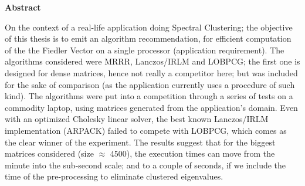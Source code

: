 \thispagestyle{plain}
\begin{center}

  \vspace{0.4cm}


  \vspace{0.9cm}
  \textbf{Abstract}
\end{center}

    On the context of a real-life application doing Spectral
    Clustering; the objective of this thesis is to emit an algorithm
    recommendation, for efficient 
    computation of the the Fiedler Vector on a single processor
    (application requirement). The algorithms considered were
    MRRR, Lanczos/IRLM and LOBPCG; the first one is designed for dense
    matrices, hence not really a competitor here; but was 
    included for the sake of comparison (as the application currently
    uses a procedure of such kind). The algorithms were put into
    a competition through a series of tests on a commodity laptop, 
    using matrices generated from the application's domain. Even with
    an optimized Cholesky linear solver, the best known Lanczos/IRLM
    implementation (ARPACK) failed to compete with LOBPCG, which comes
    as the clear winner of the experiment. The results suggest that
    for the biggest matrices considered (size $\approx$ 4500), the
    execution times can 
    move from the minute into the sub-second scale; and to a couple of
    seconds, if we include the time of the pre-processing to eliminate
    clustered eigenvalues. 
